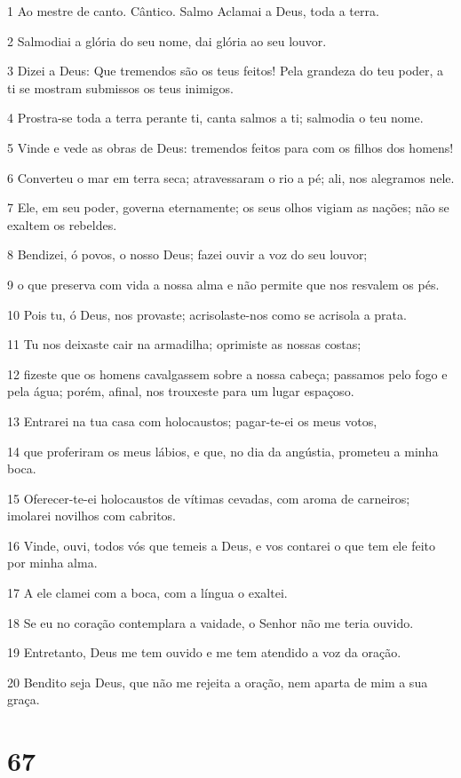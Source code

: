 \par 1 Ao mestre de canto. Cântico. Salmo Aclamai a Deus, toda a terra.
\par 2 Salmodiai a glória do seu nome, dai glória ao seu louvor.
\par 3 Dizei a Deus: Que tremendos são os teus feitos! Pela grandeza do teu poder, a ti se mostram submissos os teus inimigos.
\par 4 Prostra-se toda a terra perante ti, canta salmos a ti; salmodia o teu nome.
\par 5 Vinde e vede as obras de Deus: tremendos feitos para com os filhos dos homens!
\par 6 Converteu o mar em terra seca; atravessaram o rio a pé; ali, nos alegramos nele.
\par 7 Ele, em seu poder, governa eternamente; os seus olhos vigiam as nações; não se exaltem os rebeldes.
\par 8 Bendizei, ó povos, o nosso Deus; fazei ouvir a voz do seu louvor;
\par 9 o que preserva com vida a nossa alma e não permite que nos resvalem os pés.
\par 10 Pois tu, ó Deus, nos provaste; acrisolaste-nos como se acrisola a prata.
\par 11 Tu nos deixaste cair na armadilha; oprimiste as nossas costas;
\par 12 fizeste que os homens cavalgassem sobre a nossa cabeça; passamos pelo fogo e pela água; porém, afinal, nos trouxeste para um lugar espaçoso.
\par 13 Entrarei na tua casa com holocaustos; pagar-te-ei os meus votos,
\par 14 que proferiram os meus lábios, e que, no dia da angústia, prometeu a minha boca.
\par 15 Oferecer-te-ei holocaustos de vítimas cevadas, com aroma de carneiros; imolarei novilhos com cabritos.
\par 16 Vinde, ouvi, todos vós que temeis a Deus, e vos contarei o que tem ele feito por minha alma.
\par 17 A ele clamei com a boca, com a língua o exaltei.
\par 18 Se eu no coração contemplara a vaidade, o Senhor não me teria ouvido.
\par 19 Entretanto, Deus me tem ouvido e me tem atendido a voz da oração.
\par 20 Bendito seja Deus, que não me rejeita a oração, nem aparta de mim a sua graça.

\chapter{67}

